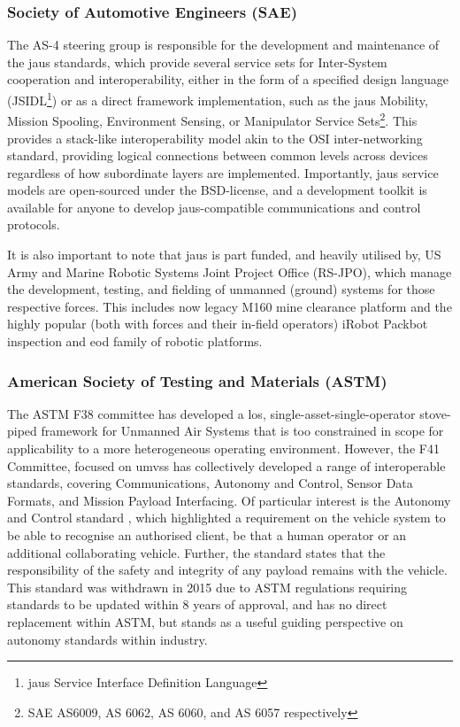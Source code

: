 \subsubsection{Society of Automotive Engineers (SAE)}

The AS-4 steering group is responsible for the development and maintenance of the \gls{jaus} standards, which provide several service sets for Inter-System cooperation and interoperability, either in the form of a specified design language (JSIDL\footnote{\gls{jaus} Service Interface Definition Language}) or as a direct framework implementation, such as the \gls{jaus} Mobility, Mission Spooling, Environment Sensing, or Manipulator Service Sets\footnote{SAE AS6009, AS 6062, AS 6060, and AS 6057 respectively}.
This provides a stack-like interoperability model akin to the OSI inter-networking standard, providing logical connections between common levels across devices regardless of how subordinate layers are implemented.
Importantly, \gls{jaus} service models are open-sourced under the BSD-license, and a development toolkit is available for anyone to develop \gls{jaus}-compatible communications and control protocols\cite{JTS}.

It is also important to note that \gls{jaus} is part funded, and heavily utilised by, US Army and Marine Robotic Systems Joint Project Office (RS-JPO), which manage the development, testing, and fielding of unmanned (ground) systems for those respective forces.
This includes now legacy M160 mine clearance platform and the highly popular (both with forces and their in-field operators) iRobot Packbot inspection and \gls{eod} family of robotic platforms.

\subsubsection{American Society of Testing and Materials (ASTM)}

The ASTM F38 committee has developed a \gls{los}, single-asset-single-operator stove-piped framework for Unmanned Air Systems that is too constrained in scope for applicability to a more heterogeneous operating environment\cite{AmericanSocietyofTestingandMaterials2007}.
However, the F41 Committee, focused on \glspl{umvs} has collectively developed a range of interoperable standards, covering Communications, Autonomy and Control, Sensor Data Formats, and Mission Payload Interfacing.
Of particular interest is the Autonomy and Control standard \cite{AmericanSocietyofTestingandMaterials2006}, which highlighted a requirement on the vehicle system to be able to recognise an authorised client, be that a human operator or an additional collaborating vehicle.
Further, the standard states that the responsibility of the safety and integrity of any payload remains with the vehicle.
This standard was withdrawn in 2015 due to ASTM regulations requiring standards to be updated within 8 years of approval, and has no direct replacement within ASTM, but stands as a useful guiding perspective on autonomy standards within industry.

